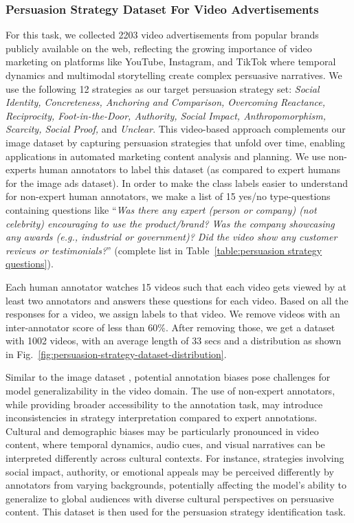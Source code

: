 \subsubsection{Persuasion Strategy Dataset For Video Advertisements}
For this task, we collected 2203 video advertisements from popular brands publicly available on the web, reflecting the growing importance of video marketing on platforms like YouTube, Instagram, and TikTok where temporal dynamics and multimodal storytelling create complex persuasive narratives. We use the following 12 strategies as our target persuasion strategy set: \textit{Social Identity, Concreteness, Anchoring and Comparison, Overcoming Reactance, Reciprocity, Foot-in-the-Door, Authority, Social Impact, Anthropomorphism, Scarcity, Social Proof,} and \textit{Unclear}. This video-based approach complements our image dataset by capturing persuasion strategies that unfold over time, enabling applications in automated marketing content analysis and planning. We use non-experts human annotators to label this dataset (as compared to expert humans for the image ads dataset). In order to make the class labels easier to understand for non-expert human annotators, we make a list of 15 yes/no type-questions containing questions like ``\textit{Was there any expert (person or company) (not celebrity) encouraging to use the product/brand? Was the company showcasing any awards (e.g., industrial or government)? Did the video show any customer reviews or testimonials?}'' (complete list in Table~\ref{table:persuasion strategy questions}). 

Each human annotator watches 15 videos such that each video gets viewed by at least two annotators and answers these questions for each video. Based on all the responses for a video, we assign labels to that video. We remove videos with an inter-annotator score of less than 60\%. After removing those, we get a dataset with 1002 videos, with an average length of 33 secs and a distribution as shown in Fig.~\ref{fig:persuasion-strategy-dataset-distribution}. 

Similar to the image dataset \cite{kumar2023persuasion}, potential annotation biases pose challenges for model generalizability in the video domain. The use of non-expert annotators, while providing broader accessibility to the annotation task, may introduce inconsistencies in strategy interpretation compared to expert annotations. Cultural and demographic biases may be particularly pronounced in video content, where temporal dynamics, audio cues, and visual narratives can be interpreted differently across cultural contexts. For instance, strategies involving social impact, authority, or emotional appeals may be perceived differently by annotators from varying backgrounds, potentially affecting the model's ability to generalize to global audiences with diverse cultural perspectives on persuasive content. This dataset is then used for the persuasion strategy identification task.

